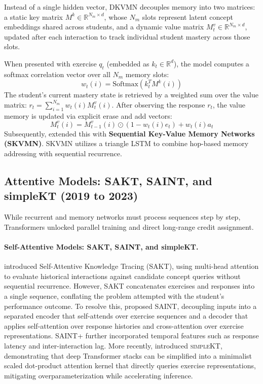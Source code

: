 \documentclass[11pt]{article}
\begin{document}
Instead of a single hidden vector, DKVMN decouples memory into two matrices: a static key matrix $M^k \in \mathbb{R}^{N_m \times d}$, whose $N_m$ slots represent latent concept embeddings shared across students, and a dynamic value matrix $M_t^v \in \mathbb{R}^{N_m \times d}$, updated after each interaction to track individual student mastery across those slots.

When presented with exercise $q_t$ (embedded as $k_t \in \mathbb{R}^d$), the model computes a softmax correlation vector over all $N_m$ memory slots:
\begin{equation}
w_t(i) = \text{Softmax}(k_t^T M^k(i))
\end{equation}
The student's current mastery state is retrieved by a weighted sum over the value matrix: $r_t = \sum_{i=1}^{N_m} w_t(i) M_t^v(i)$. After observing the response $r_t$, the value memory is updated via explicit erase and add vectors:
\begin{equation}
M_t^v(i) = M_{t-1}^v(i) \odot (1 - w_t(i) e_t) + w_t(i) a_t
\end{equation}
Subsequently, \citet{abdelrahman2019knowledge} extended this with \textbf{Sequential Key-Value Memory Networks (\textsc{SKVMN})}. SKVMN utilizes a triangle LSTM to combine hop-based memory addressing with sequential recurrence.

\subsection{Attentive Models: SAKT, SAINT, and simpleKT (2019 to 2023)}
While recurrent and memory networks must process sequences step by step, Transformers \citep{vaswani2017attention} unlocked parallel training and direct long-range credit assignment.

\paragraph{Self-Attentive Models: SAKT, SAINT, and simpleKT.}
\citet{pandey2019self} introduced Self-Attentive Knowledge Tracing (\textsc{SAKT}), using multi-head attention to evaluate historical interactions against candidate concept queries without sequential recurrence. However, SAKT concatenates exercises and responses into a single sequence, conflating the problem attempted with the student's performance outcome. To resolve this, \citet{choi2020towards} proposed \textsc{SAINT}, decoupling inputs into a separated encoder that self-attends over exercise sequences and a decoder that applies self-attention over response histories and cross-attention over exercise representations. \textsc{SAINT+} \citep{shin2021saint} further incorporated temporal features such as response latency and inter-interaction lag. More recently, \citet{liu2023simplekt} introduced \textsc{simpleKT}, demonstrating that deep Transformer stacks can be simplified into a minimalist scaled dot-product attention kernel that directly queries exercise representations, mitigating overparameterization while accelerating inference.
\end{document}

